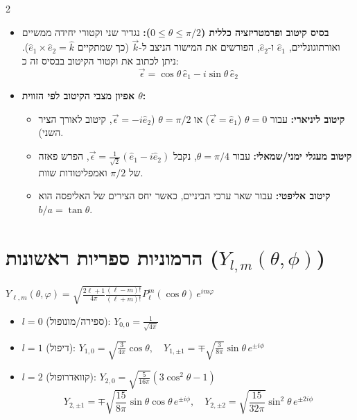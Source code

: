 \documentclass[10pt,a4paper]{article}
\begin{document}
\begin{multicols*}{2}
\begin{itemize}[leftmargin=*]
    \item \textbf{בסיס קיטוב ופרמטריזציה כללית ($0 \le \theta \le \pi/2$):}
    נגדיר שני וקטורי יחידה ממשיים ואורתוגונליים, $\hat{e}_1$ ו-$\hat{e}_2$, הפורשים את המישור הניצב ל-$\vec{k}$ (כך שמתקיים $\hat{e}_1 \times \hat{e}_2 = \hat{k}$). ניתן לכתוב את וקטור הקיטוב בבסיס זה כ:
    $$\vec{\epsilon} = \cos\theta \, \hat{e}_1 - i\sin\theta \, \hat{e}_2$$

    \item \textbf{אפיון מצבי הקיטוב לפי הזווית $\theta$:}
    \begin{itemize}
        \item \textbf{קיטוב ליניארי:} עבור $\theta = 0$ ($\vec{\epsilon} = \hat{e}_1$) או $\theta = \pi/2$ ($\vec{\epsilon} = -i\hat{e}_2$, קיטוב לאורך הציר השני).
        \item \textbf{קיטוב מעגלי ימני/שמאלי:} עבור $\theta = \pi/4$, נקבל $\vec{\epsilon} = \frac{1}{\sqrt{2}}(\hat{e}_1 - i\hat{e}_2)$, הפרש פאזה של $\pi/2$ ואמפליטודות שוות.
        \item \textbf{קיטוב אליפטי:} עבור שאר ערכי הביניים, כאשר יחס הצירים של האליפסה הוא $b/a = \tan\theta$.
    \end{itemize}
\end{itemize}

\section*{הרמוניות ספריות ראשונות ($Y_{l,m}(\theta, \phi)$)}
$Y_{\ell,m}(\theta, \varphi) = \sqrt{\frac{2\ell+1}{4\pi} \frac{(\ell-m)!}{(\ell+m)!}} P_\ell^m(\cos\theta) \, e^{im\varphi}$

\begin{itemize}[leftmargin=*]

    \item $l=0$ (ספירה/מונופול): 
    $Y_{0,0} = \frac{1}{\sqrt{4\pi}}$
    
    \item $l=1$ (דיפול):
    $Y_{1,0} = \sqrt{\frac{3}{4\pi}} \cos\theta, \quad Y_{1,\pm 1} = \mp \sqrt{\frac{3}{8\pi}} \sin\theta \, e^{\pm i \phi}$

    \item $l=2$ (קוואדרופול):
    $Y_{2,0} = \sqrt{\frac{5}{16\pi}} \left(3\cos^2\theta - 1\right)$
    $$Y_{2,\pm 1} = \mp \sqrt{\frac{15}{8\pi}} \sin\theta \cos\theta \, e^{\pm i \phi}, \quad Y_{2,\pm 2} = \sqrt{\frac{15}{32\pi}} \sin^2\theta \, e^{\pm 2i \phi}$$
\end{itemize}


\end{multicols*}
\end{document}

